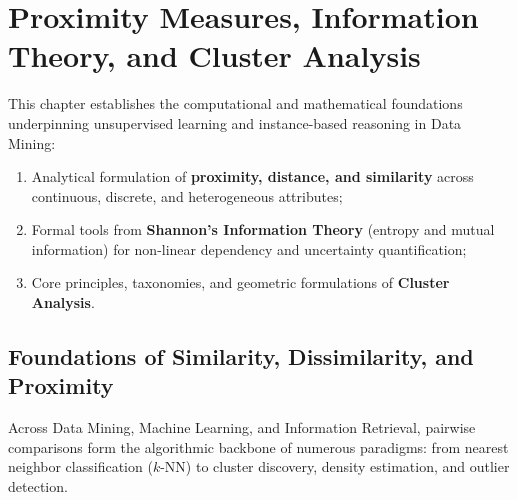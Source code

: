 \chapter{Proximity Measures, Information Theory, and Cluster Analysis}
\label{chap:dm-similarity-clustering-foundations}

This chapter establishes the computational and mathematical foundations underpinning unsupervised learning and instance-based reasoning in Data Mining:
\begin{enumerate}[noitemsep]
    \item Analytical formulation of \textbf{proximity, distance, and similarity} across continuous, discrete, and heterogeneous attributes;
    \item Formal tools from \textbf{Shannon's Information Theory} (entropy and mutual information) for non-linear dependency and uncertainty quantification;
    \item Core principles, taxonomies, and geometric formulations of \textbf{Cluster Analysis}.
\end{enumerate}

\section{Foundations of Similarity, Dissimilarity, and Proximity}
\label{sec:dm-foundations-proximity}

Across Data Mining, Machine Learning, and Information Retrieval, pairwise comparisons form the algorithmic backbone of numerous paradigms: from nearest neighbor classification ($k$-NN) to cluster discovery, density estimation, and outlier detection.

